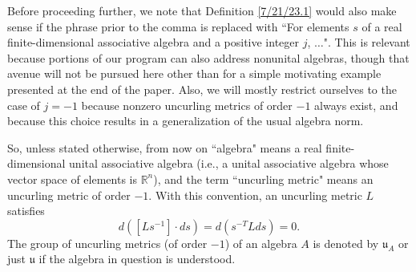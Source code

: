 \documentclass{amsart}
\numberwithin{equation}{section}
\theoremstyle{definition}
\numberwithin{theorem}{section}
\begin{document}
   Before proceeding further, we note that Definition \ref{7/21/23.1} would also make sense if the phrase prior to the comma is replaced with ``For elements $s$ of a real finite-dimensional associative algebra and a positive integer $j$, $\dots$".
     This is relevant because portions of our program can also address nonunital algebras, though that avenue will not be pursued here other than for a simple motivating example presented at the end of the paper.  Also, we will mostly restrict ourselves to the case of $j=-1$ because nonzero uncurling metrics of order $-1$ always exist, and because this choice results in a generalization of the usual algebra norm.
     
     So, unless stated otherwise, from now on ``algebra" means a real finite-dimensional unital associative algebra (i.e., a unital associative algebra whose vector space of elements is $\mathbb{R}^n$), and the term ``uncurling metric" means an uncurling metric of order $-1$.  With this convention, an uncurling metric $L$ satisfies \begin{equation}\label{4/7/23.1} d([Ls^{-1}]\cdot ds) = d\left(s^{-T} L ds\right) = 0. \end{equation}  
  The group of uncurling metrics (of order $-1$) of an algebra $A$ is denoted by $\mathfrak{u}_A$ or just $\mathfrak{u}$ if the algebra in question is understood.
     
\end{document}
